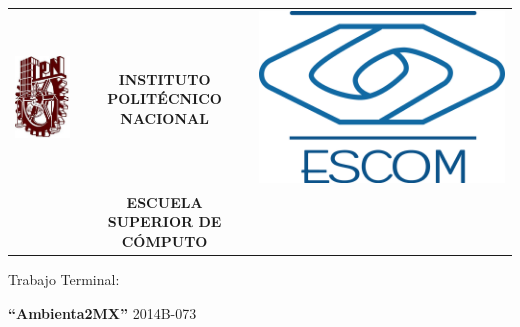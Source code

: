\begin{titlepage}
    \begin{center}
    \begin{tabular}{r c l}
    \includegraphics[scale=.20]{images/ipn} & \textbf{INSTITUTO POLIT\'ECNICO NACIONAL} & \includegraphics[scale=.20]{images/escom}\\ 
    & \textbf{ESCUELA SUPERIOR DE C\'OMPUTO}
    \end{tabular}
    \end{center}


    \vspace{1.5cm}
    \begin{center}
    \large Trabajo Terminal: \linebreak

    \large \textbf{``Ambienta2MX''} \linebreak
    \large 2014B-073


\end{center}
\end{titlepage}
